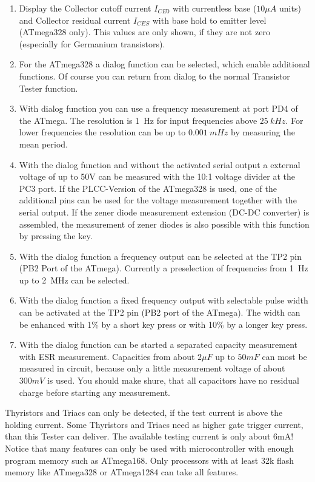 \begin{enumerate}
\item Display the Collector cutoff current \(I_{CE0}\) with currentless base (\(10\mu A\) units) and
Collector residual current \(I_{CES}\) with base hold to emitter level (ATmega328 only).
This values are only shown, if they are not zero (especially for Germanium transistors).
\item For the ATmega328 a dialog function can be selected, which enable additional functions.
Of course you can return from dialog to the normal Transistor Tester function.
\item With dialog function you can use a frequency measurement at port PD4 of the ATmega.
The resolution is 1~Hz for input frequencies above \(25~kHz\).
For lower frequencies the resolution can be up to \(0.001~mHz\) by measuring the mean period.
\item With the dialog function and without the activated serial output a external voltage of up to 50V can be measured with
the 10:1 voltage divider at the PC3 port. If the PLCC-Version of the ATmega328 is used, one of the additional
pins can be used for the voltage measurement together with the serial output.
If the zener diode measurement extension (DC-DC converter) is assembled, the measurement of
zener diodes is also possible with this function by pressing the key.
\item With the dialog function a frequency output can be selected at the TP2 pin (PB2 Port of the ATmega).
Currently a preselection of frequencies from 1~Hz up to 2~MHz can be selected.
\item With the dialog function a fixed frequency output with selectable pulse width can be activated at the TP2 pin
(PB2 port of the ATmega). The width can be enhanced with 1\% by a short key press or with 10\% by a longer key press.
\item With the dialog function can be started a separated capacity measurement with ESR measurement.
Capacities from about \(2 \mu F\) up to \(50 mF\) can most be measured in circuit, because only a little
measurement voltage of about \(300 mV\) is used.
You should make shure, that all capacitors have no residual charge before starting any measurement.

\end{enumerate}

Thyristors and Triacs can only be detected, if the test current is above the holding current.
Some Thyristors and Triacs need as higher gate trigger current, than this Tester can deliver.
The available testing current is only about 6mA!
Notice that many features can only be used with microcontroller with enough program memory such as ATmega168.
Only processors with at least 32k flash memory like ATmega328 or ATmega1284 can take all features.

